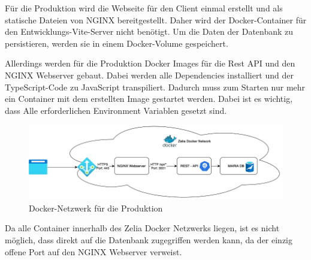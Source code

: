 
Für die Produktion wird die Webseite für den Client einmal erstellt und als statische Dateien von NGINX bereitgestellt. Daher wird der Docker-Container für den Entwicklungs-Vite-Server nicht benötigt. Um die Daten der Datenbank zu persistieren, werden sie in einem Docker-Volume gespeichert. 

Allerdings werden für die Produktion Docker Images für die Rest API und den NGINX Webserver gebaut. Dabei werden alle Dependencies installiert und der TypeScript-Code zu JavaScript transpiliert. Dadurch muss zum Starten nur mehr ein Container mit dem erstellten Image gestartet werden. Dabei ist es wichtig, dass Alle erforderlichen Environment Variablen gesetzt sind.

\begin{figure}[H]
    \centering
    \includegraphics{media/Docker/ProdNetwork.png}
    \caption{Docker-Netzwerk für die Produktion}
\end{figure}

Da alle Container innerhalb des Zelia Docker Netzwerks liegen, ist es nicht möglich, dass direkt auf die Datenbank zugegriffen werden kann, da der einzig offene Port auf den NGINX Webserver verweist. 


